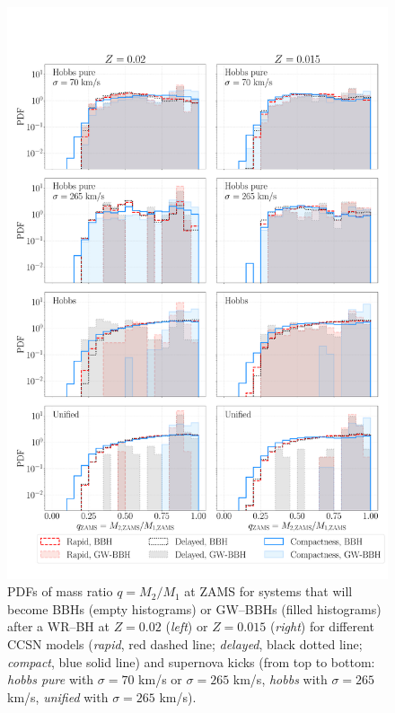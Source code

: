 \documentclass[a4paper,titlepage]{book}     	%
\begin{document}
\begin{appendices}
\begin{figure}
	\centering
	\includegraphics[width=\textwidth]{./images/progq.pdf}	
	\caption{PDFs of mass ratio $q=M_2/M_1$ at ZAMS for systems that will become BBHs (empty histograms) or GW--BBHs (filled histograms) after a WR--BH at $Z=0.02$ (\emph{left}) or $Z=0.015$ (\emph{right}) for different CCSN models (\emph{rapid}, red dashed line; \emph{delayed}, black dotted line; \emph{compact}, blue solid line) and supernova kicks (from top to bottom: \emph{hobbs pure} with $\sigma = 70$ km/s or $\sigma = 265$ km/s, \emph{hobbs} with $\sigma = 265$ km/s, \emph{unified} with $\sigma = 265$ km/s).}\label{fig:resultsqprog}
\end{figure}


\end{appendices}
\end{document}
